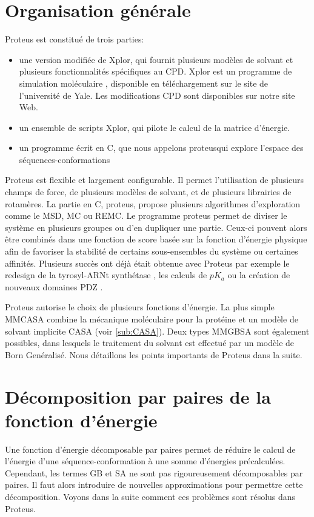 \section{Organisation générale}

Proteus est constitué de trois parties:
\begin{itemize}
\item une version modifiée de Xplor, qui fournit plusieurs modèles de solvant et plusieurs fonctionnalités spécifiques au CPD. Xplor est un programme de simulation moléculaire \cite{Xplor}, disponible en téléchargement sur le site de l'université de Yale. Les modifications CPD sont disponibles sur notre site Web. 
\item un ensemble de scripts Xplor, qui pilote le calcul de la matrice d'énergie. 
\item un programme écrit en C, que nous appelons \og proteus\fg qui explore l'espace des séquences-conformations
\end{itemize}
Proteus est flexible et largement configurable. Il permet l'utilisation de plusieurs champs de force, de plusieurs modèles de solvant, et de plusieurs librairies de rotamères. La partie en C, proteus, propose plusieurs algorithmes d'exploration comme le MSD, MC ou REMC. Le programme proteus permet de diviser le système en plusieurs groupes ou d'en dupliquer une partie. Ceux-ci pouvent alors être combinés dans une fonction de score basée sur la fonction d'énergie physique afin de favoriser la stabilité de certains sous-ensembles du système ou certaines affinités. Plusieurs succès ont déjà était obtenue avec Proteus par exemple le redesign de la tyrosyl-ARNt synthétase \cite{Simonson16}, les calculs de $pK_a$ \cite{Villa17} ou la création de nouveaux domaines PDZ \cite{Mignon17}.

Proteus autorise le choix de plusieurs fonctions d'énergie. La plus simple \og MMCASA \fg combine la mécanique moléculaire pour la protéine et un modèle de solvant implicite CASA (voir  \vref{sub:CASA}). Deux types \og MMGBSA \fg sont également possibles, dans lesquels le traitement du solvant est effectué par un modèle de Born Genéralisé. Nous détaillons les points importants de Proteus dans la suite.

\section{Décomposition par paires de la fonction d'énergie}
Une fonction d'énergie décomposable par paires permet de réduire le calcul de l'énergie d'une séquence-conformation à une somme d'énergies précalculées. Cependant, les termes GB et SA ne sont pas rigoureusement décomposables par paires. Il faut alors introduire de nouvelles approximations pour permettre cette décomposition. Voyons dans la suite comment ces problèmes sont résolus dans Proteus.
